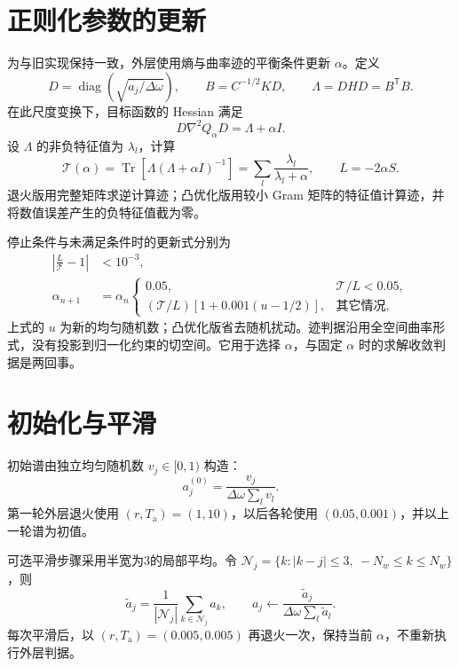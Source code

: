\documentclass[UTF8,fontset=fandol,11pt]{ctexart}
\begin{document}
\section{正则化参数的更新}
为与旧实现保持一致，外层使用熵与曲率迹的平衡条件更新 $\alpha$。定义
\begin{equation}
    D=\operatorname{diag}\left(\sqrt{a_j/\Delta\omega}\right),\qquad B=C^{-1/2}KD,\qquad \Lambda=DHD=B^{\mathsf T}B.
\end{equation}
在此尺度变换下，目标函数的 Hessian 满足
\begin{equation}
    D\nabla^2Q_\alpha D=\Lambda+\alpha I.
\end{equation}
设 $\Lambda$ 的非负特征值为 $\lambda_l$，计算
\begin{equation}
    \mathcal T(\alpha)=\operatorname{Tr}[\Lambda(\Lambda+\alpha I)^{-1}]=\sum_l\frac{\lambda_l}{\lambda_l+\alpha},\qquad L=-2\alpha S.
\end{equation}
退火版用完整矩阵求逆计算迹；凸优化版用较小 Gram 矩阵的特征值计算迹，并将数值误差产生的负特征值截为零。

停止条件与未满足条件时的更新式分别为
\begin{align}
    \left|\frac{L}{\mathcal T}-1\right|&<10^{-3},\\
    \alpha_{n+1}&=\alpha_n\begin{cases}0.05,&\mathcal T/L<0.05,\\(\mathcal T/L)[1+0.001(u-1/2)],&\text{其它情况},\end{cases}
\end{align}
上式的 $u$ 为新的均匀随机数；凸优化版省去随机扰动。迹判据沿用全空间曲率形式，没有投影到归一化约束的切空间。它用于选择 $\alpha$，与固定 $\alpha$ 时的求解收敛判据是两回事。

\section{初始化与平滑}
初始谱由独立均匀随机数 $v_j\in[0,1)$ 构造：
\begin{equation}
    a_j^{(0)}=\frac{v_j}{\Delta\omega\sum_l v_l}.
\end{equation}
第一轮外层退火使用 $(r,T_{\mathrm a})=(1,10)$，以后各轮使用 $(0.05,0.001)$，并以上一轮谱为初值。

可选平滑步骤采用半宽为3的局部平均。令 $\mathcal N_j=\{k:|k-j|\leq3,\ -N_w\leq k\leq N_w\}$，则
\begin{equation}
    \widetilde a_j=\frac{1}{|\mathcal N_j|}\sum_{k\in\mathcal N_j}a_k,\qquad a_j\leftarrow\frac{\widetilde a_j}{\Delta\omega\sum_l\widetilde a_l}.
\end{equation}
每次平滑后，以 $(r,T_{\mathrm a})=(0.005,0.005)$ 再退火一次，保持当前 $\alpha$，不重新执行外层判据。
\end{document}
